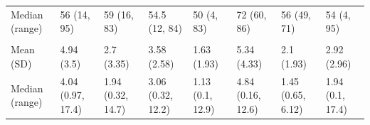 \documentclass[
  letterpaper,
  DIV=11,
  numbers=noendperiod]{scrartcl}
\begin{document}
\begin{table}
{{\begin{tabular}[t]{llllllll}
\hspace{1em}{}Median (range) & {}56 (14, 95) & {}59 (16, 83) & {}54.5 (12, 84) & {}50 (4, 83) & {}72 (60, 86) & {}56 (49, 71) & {}54 (4, 95)\\
\addlinespace[0.3em]
\multicolumn{8}{l}{\textbf{\(\mathrm{\textrm{Tumor} \textrm{ } \textrm{Thickness} \textrm{ } \textrm{(mm)}}\)}}\\
\hspace{1em}{}Mean (SD) & {}4.94 (3.5) & {}2.7 (3.35) & {}3.58 (2.58) & {}1.63 (1.93) & {}5.34 (4.33) & {}2.1 (1.93) & {}2.92 (2.96)\\
\hspace{1em}{}Median (range) & {}4.04 (0.97, 17.4) & {}1.94 (0.32, 14.7) & {}3.06 (0.32, 12.2) & {}1.13 (0.1, 12.9) & {}4.84 (0.16, 12.6) & {}1.45 (0.65, 6.12) & {}1.94 (0.1, 17.4)\\
\bottomrule
\end{tabular}}

}

\end{table}%
\end{document}
